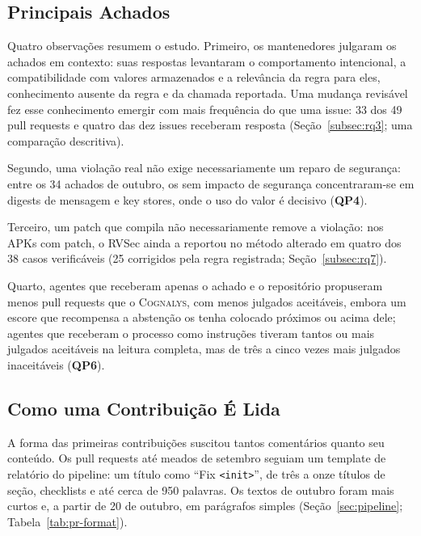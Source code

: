 \documentclass[conference]{IEEEtran}
\newcommand{\system}{\textsc{Cognalys}}
\newcommand{\researchq}[1]{\textbf{QP#1}}
\begin{document}
\subsection{Principais Achados}

Quatro observações resumem o estudo. Primeiro, os mantenedores julgaram os achados em
contexto: suas respostas levantaram o comportamento
intencional, a compatibilidade com valores armazenados e a relevância da regra
para eles, conhecimento ausente da regra e da chamada reportada. Uma mudança revisável fez
esse conhecimento emergir com mais frequência do que uma issue: 33 dos 49 pull
requests e quatro das dez issues receberam resposta (Seção~\ref{subsec:rq3}; uma
comparação descritiva).

Segundo, uma violação real não exige necessariamente um reparo de segurança: entre os
34 achados de outubro, os sem impacto de segurança concentraram-se em digests de mensagem
e key stores, onde o uso do valor é decisivo (\researchq{4}).

Terceiro, um patch que compila não necessariamente remove a violação: nos APKs
com patch, o RVSec ainda a reportou no método alterado em quatro dos 38 casos
verificáveis (25 corrigidos pela regra registrada; Seção~\ref{subsec:rq7}).

Quarto, agentes que receberam apenas o achado e o repositório propuseram menos pull
requests que o \system{}, com menos julgados aceitáveis, embora um escore que recompensa
a abstenção os tenha colocado próximos ou acima dele; agentes que receberam o processo
como instruções tiveram tantos ou mais julgados aceitáveis na leitura completa, mas de
três a cinco vezes mais julgados inaceitáveis (\researchq{6}).

\subsection{Como uma Contribuição É Lida}
\label{subsec:form}

A forma das primeiras contribuições suscitou tantos comentários quanto seu conteúdo. Os pull
requests até meados de setembro seguiam um template de relatório do pipeline: um título como
``Fix \texttt{<init>}'', de três a onze títulos de seção, checklists e até
cerca de 950 palavras. Os textos de outubro foram mais curtos e, a partir de 20 de
outubro, em parágrafos simples (Seção~\ref{sec:pipeline}; Tabela~\ref{tab:pr-format}).
\end{document}
